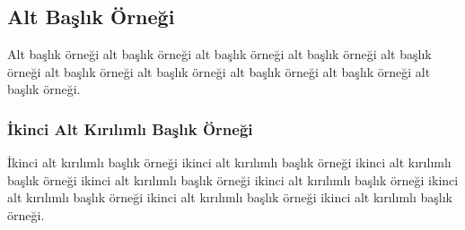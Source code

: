 \subsection{Alt Başlık Örneği}

Alt başlık örneği alt başlık örneği alt başlık örneği alt başlık örneği alt başlık örneği alt başlık örneği alt başlık örneği alt başlık örneği alt başlık örneği alt başlık örneği.

\subsubsection{İkinci Alt Kırılımlı Başlık Örneği}

İkinci alt kırılımlı başlık örneği ikinci alt kırılımlı başlık örneği ikinci alt kırılımlı başlık örneği ikinci alt kırılımlı başlık örneği ikinci alt kırılımlı başlık örneği ikinci alt kırılımlı başlık örneği ikinci alt kırılımlı başlık örneği ikinci alt kırılımlı başlık örneği.
